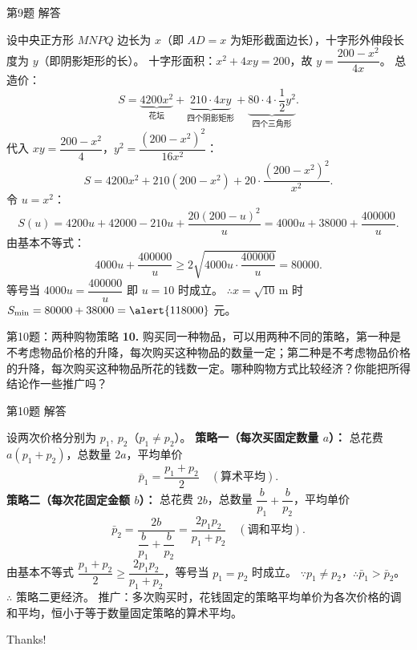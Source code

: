 \documentclass[10pt,aspectratio=169,serif]{beamer}
\begin{document}
\begin{frame}[t]{第9题 解答}
\begin{tcolorbox}[colback=orange!10,colframe=orange,title=\textbf{解}]
设中央正方形 $MNPQ$ 边长为 $x$（即 $AD=x$ 为矩形截面边长），十字形外伸段长度为 $y$（即阴影矩形的长）。
\vspace{0.3em}
十字形面积：$x^{2}+4xy=200$，故 $y=\dfrac{200-x^{2}}{4x}$。
\vspace{0.3em}
总造价：
\[
S=\underbrace{4200x^{2}}_{\text{花坛}}+\underbrace{210\cdot 4xy}_{\text{四个阴影矩形}}+\underbrace{80\cdot 4\cdot\frac{1}{2}y^{2}}_{\text{四个三角形}}.
\]
代入 $xy=\dfrac{200-x^{2}}{4}$，$y^{2}=\dfrac{(200-x^{2})^{2}}{16x^{2}}$：
\[
S=4200x^{2}+210(200-x^{2})+20\cdot\frac{(200-x^{2})^{2}}{x^{2}}.
\]
令 $u=x^{2}$：
\[
S(u)=4200u+42000-210u+\frac{20(200-u)^{2}}{u}
=4000u+38000+\frac{400000}{u}.
\]
由基本不等式：
\[
4000u+\frac{400000}{u}\ge 2\sqrt{4000u\cdot\frac{400000}{u}}=80000.
\]
等号当 $4000u=\dfrac{400000}{u}$ 即 $u=10$ 时成立。
\vspace{0.3em}
$\therefore x=\sqrt{10}\,\text{m}$ 时 $S_{\min}=80000+38000=\alert{118000}$ 元。
\end{tcolorbox}
\end{frame}

\begin{frame}[t]{第10题：两种购物策略}
\textbf{10.} 购买同一种物品，可以用两种不同的策略，第一种是不考虑物品价格的升降，每次购买这种物品的数量一定；第二种是不考虑物品价格的升降，每次购买这种物品所花的钱数一定。哪种购物方式比较经济？你能把所得结论作一些推广吗？
\end{frame}

\begin{frame}[t]{第10题 解答}
\begin{tcolorbox}[colback=orange!10,colframe=orange,title=\textbf{解}]
设两次价格分别为 $p_{1},\ p_{2}$（$p_{1}\neq p_{2}$）。
\vspace{0.3em}
\textbf{策略一（每次买固定数量 $a$）：}
总花费 $a(p_{1}+p_{2})$，总数量 $2a$，平均单价
\[
\bar{p}_{1}=\frac{p_{1}+p_{2}}{2}\quad(\text{算术平均}).
\]
\textbf{策略二（每次花固定金额 $b$）：}
总花费 $2b$，总数量 $\dfrac{b}{p_{1}}+\dfrac{b}{p_{2}}$，平均单价
\[
\bar{p}_{2}=\frac{2b}{\dfrac{b}{p_{1}}+\dfrac{b}{p_{2}}}=\frac{2p_{1}p_{2}}{p_{1}+p_{2}}\quad(\text{调和平均}).
\]
由基本不等式 $\dfrac{p_{1}+p_{2}}{2}\ge \dfrac{2p_{1}p_{2}}{p_{1}+p_{2}}$，等号当 $p_{1}=p_{2}$ 时成立。
$\because p_{1}\neq p_{2}$，$\therefore \bar{p}_{1}>\bar{p}_{2}$。
\vspace{0.5em}
$\therefore$ \alert{策略二更经济}。
\vspace{0.3em}
{\small 推广：多次购买时，花钱固定的策略平均单价为各次价格的调和平均，恒小于等于数量固定策略的算术平均。}
\end{tcolorbox}
\end{frame}

\begin{frame}[c]
  \begin{center}
    {\Huge\calligra Thanks!}
  \end{center}
\end{frame}
\end{document}
